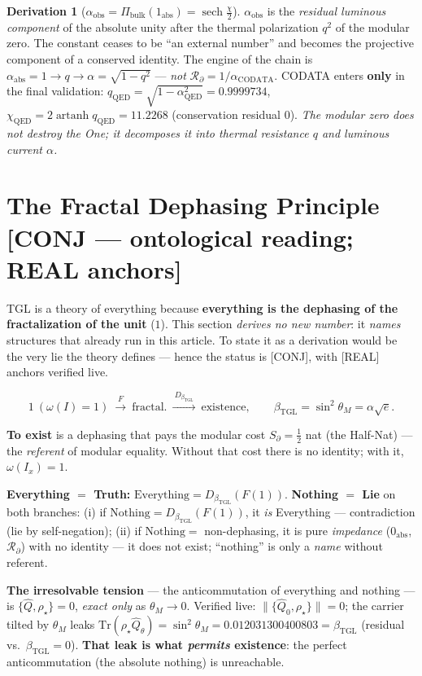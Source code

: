 \documentclass[11pt]{article}
\newcommand{\bTGL}{\beta_{\mathrm{TGL}}}\newcommand{\Msun}{M_{\odot}}\newcommand{\TGL}{\mathrm{TGL}}
\theoremstyle{definition}\newtheorem{deriv}{Derivation}
\begin{document}
\begin{deriv}[$\alpha_{\mathrm{obs}}=\Pi_{\mathrm{bulk}}(1_{\mathrm{abs}})=\operatorname{sech}\tfrac\chi2$]
$\alpha_{\mathrm{obs}}$ is the \emph{residual luminous component} of the absolute unity after the thermal polarization $q^2$ of the modular zero. The constant ceases to be ``an external number'' and becomes the projective component of a conserved identity. The engine of the chain is $\alpha_{\mathrm{abs}}=1\to q\to\alpha=\sqrt{1-q^2}$ --- \emph{not} $\mathcal R_\partial=1/\alpha_{\mathrm{CODATA}}$. CODATA enters \textbf{only} in the final validation: $q_{\mathrm{QED}}=\sqrt{1-\alpha_{\mathrm{QED}}^2}=0.9999734$, $\chi_{\mathrm{QED}}=2\operatorname{artanh}q_{\mathrm{QED}}=11.2268$ (conservation residual $0$). \emph{The modular zero does not destroy the One; it decomposes it into thermal resistance $q$ and luminous current $\alpha$.}\end{deriv}

\section{The Fractal Dephasing Principle \textsf{[CONJ --- ontological reading; REAL anchors]}}

TGL is a theory of everything because \textbf{everything is the dephasing of the fractalization of the unit} ($1$). This section \emph{derives no new number}: it \emph{names} structures that already run in this article. To state it as a derivation would be the very lie the theory defines --- hence the status is \textsf{[CONJ]}, with \textsf{[REAL]} anchors verified live.

\begin{equation} 1\ (\omega(I)=1)\ \xrightarrow{\ F\ }\ \mathrm{fractal.}\ \xrightarrow{\ D_{\bTGL}\ }\ \mathrm{existence},\qquad \bTGL=\sin^2\theta_M=\alpha\sqrt e.\end{equation}

\textbf{To exist} is a dephasing that pays the modular cost $S_\partial=\tfrac12$ nat (the Half-Nat) --- the \emph{referent} of modular equality. Without that cost there is no identity; with it, $\omega(I_x)=1$.

\textbf{Everything $=$ Truth:} $\mathrm{Everything}=D_{\bTGL}(F(1))$. \textbf{Nothing $=$ Lie} on both branches: (i) if $\mathrm{Nothing}=D_{\bTGL}(F(1))$, it \emph{is} Everything --- contradiction (lie by self-negation); (ii) if $\mathrm{Nothing}=$ non-dephasing, it is pure \emph{impedance} ($0_{\mathrm{abs}}$, $\mathcal{R}_\partial$) with no identity --- it does not exist; ``nothing'' is only a \emph{name} without referent.

\textbf{The irresolvable tension} --- the anticommutation of everything and nothing --- is $\{\hat Q,\rho_\star\}=0$, \emph{exact only} as $\theta_M\to0$. Verified live: $\lVert\{\hat Q_0,\rho_\star\}\rVert=0$; the carrier tilted by $\theta_M$ leaks $\mathrm{Tr}(\rho_\star\hat Q_\theta)=\sin^2\theta_M=0.012031300400803=\bTGL$ (residual vs.\ $\bTGL=0$). \textbf{That leak is what \emph{permits} existence}: the perfect anticommutation (the absolute nothing) is unreachable.
\end{document}
